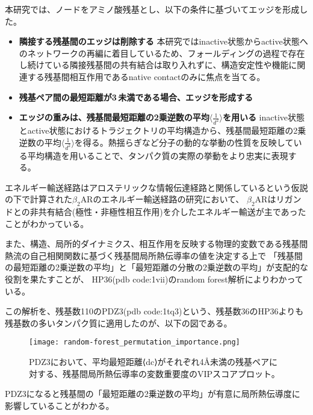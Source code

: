 本研究では、ノードをアミノ酸残基とし、以下の条件に基づいてエッジを形成した。
\begin{itemize}
    \item \textbf{隣接する残基間のエッジは削除する}  
    本研究ではinactive状態からactive状態へのネットワークの再編に着目しているため、フォールディングの過程で存在し続けている隣接残基間の共有結合は取り入れずに、構造安定性や機能に関連する残基間相互作用であるnative contactのみに焦点を当てる。
    \item \textbf{残基ペア間の最短距離が3\,\text{\AA}未満である場合、エッジを形成する}  
    \item \textbf{エッジの重みは、残基間最短距離の2乗逆数の平均$\langle \frac{1}{d^2} \rangle$を用いる}  
    inactive状態とactive状態におけるトラジェクトリの平均構造から、残基間最短距離の2乗逆数の平均$\langle \frac{1}{d^2} \rangle$を得る。熱揺らぎなど分子の動的な挙動の性質を反映している平均構造を用いることで、タンパク質の実際の挙動をより忠実に表現する。    
  \end{itemize}

エネルギー輸送経路はアロステリックな情報伝達経路と関係しているという仮説の下で計算された$\beta_2$ARのエネルギー輸送経路の研究において、
$\beta_2$ARはリガンドとの非共有結合(極性・非極性相互作用)を介したエネルギー輸送が主であったことがわかっている\cite{Helmer2022}。


また、構造、局所的ダイナミクス、相互作用を反映する物理的変数である残基間熱流の自己相関関数に基づく残基間局所熱伝導率の値を決定する上で
「残基間の最短距離の2乗逆数の平均」と「最短距離の分散の2乗逆数の平均」が支配的な役割を果たすことが、
HP36(pdb code:1vii)のrandom forest解析によりわかっている\cite{Wang2024}。

この解析を、残基数110のPDZ3(pdb code:1tq3)という、残基数36のHP36よりも残基数の多いタンパク質に適用したのが、以下の図である。

\begin{figure}[htbp]
    \centering
    \texttt{[image: random-forest\_permutation\_importance.png]}
    \caption{PDZ3において、平均最短距離⟨dc⟩がそれぞれ4Å未満の残基ペアに対する、残基間局所熱伝導率の変数重要度のVIPスコアプロット。}
    \label{fig:random_forest}
\end{figure}

\newpage

PDZ3になると残基間の「最短距離の2乗逆数の平均」が有意に局所熱伝導度に影響していることがわかる。

